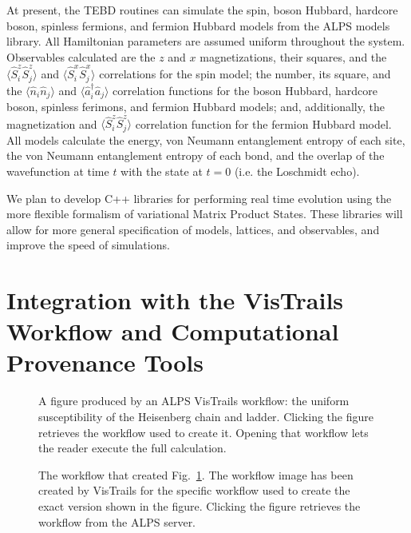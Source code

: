\documentclass[12pt]{iopart}
\begin{document}
At present, the TEBD routines can simulate the spin, boson Hubbard, hardcore boson, spinless fermions, and fermion Hubbard models from the ALPS models library.  All 
Hamiltonian parameters are assumed uniform throughout the system.  Observables calculated are the $z$ and $x$ magnetizations, their squares, and the $\langle \hat{S}^z_i 
\hat{S}^z_j\rangle$ and $\langle \hat{S}^x_i \hat{S}^x_j\rangle$ correlations for the spin model; the number, its square, and the $\langle \hat{n}_i \hat{n}_j\rangle$ and 
$\langle \hat{a}_i^{\dagger} \hat{a}_j\rangle$ correlation functions for the boson Hubbard, hardcore boson, spinless ferimons, and fermion Hubbard models; and, additionally, 
the magnetization and $\langle \hat{S}^z_i \hat{S}^z_j\rangle$ correlation function for the fermion Hubbard model.  All models calculate the energy, von Neumann entanglement 
entropy of each site, the von Neumann entanglement entropy of each bond, and the overlap of the wavefunction at time $t$ with the state at $t=0$ (i.e. the Loschmidt echo).

We plan to develop C++ libraries for performing real time evolution using the more flexible formalism of variational Matrix Product States.  These libraries will allow for more general specification of models, lattices, and observables, and improve the speed of simulations. 

\section{Integration with the VisTrails Workflow and Computational Provenance Tools}
\begin{figure}
\begin{center}

\caption{A figure produced by an ALPS VisTrails workflow: the uniform susceptibility of the Heisenberg chain and ladder. Clicking the figure retrieves the workflow used to 
create it. Opening that workflow lets the reader execute the full calculation.}
\label{fig:figure}
\end{center}
\end{figure}


\begin{figure}
\begin{center}
\caption{The workflow that created Fig.~\ref{fig:figure}. The workflow image has been created by VisTrails for the specific workflow used to create the exact version shown in the figure. Clicking the figure retrieves the workflow from the ALPS server.}
\label{fig:workflow}
\end{center}
\end{figure}
\end{document}

